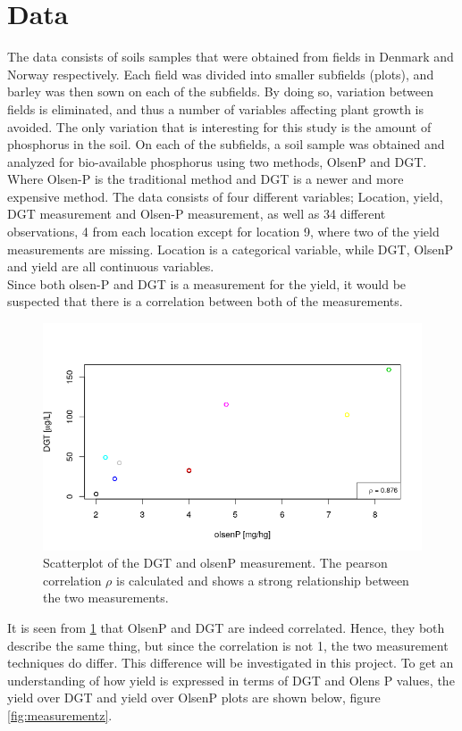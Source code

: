 \documentclass[11pt, fleqn, titlepage]{article}
\begin{document}
\section{Data}
\noindent
The data consists of soils samples that were obtained from fields in Denmark and Norway respectively. Each field was divided into smaller subfields (plots), and barley was then sown on each of the subfields. By doing so, variation between fields is eliminated, and thus a number of variables affecting plant growth is avoided. The only variation that is interesting for this study is the amount of phosphorus in the soil. On each of the subfields, a soil sample was obtained and analyzed for bio-available phosphorus using two methods, OlsenP and DGT. Where Olsen-P is the traditional method and DGT is a newer and more expensive method. The data consists of four different variables; Location, yield, DGT measurement and Olsen-P measurement, as well as 34 different observations, 4 from each location except for location 9, where two of the yield measurements are missing. Location is a categorical variable, while DGT, OlsenP and yield are all continuous variables.
\\ \noindent 
Since both olsen-P and DGT is a measurement for the yield, it would be suspected that there is a correlation between both of the measurements. 
\begin{figure}[H]
	\centering
	\includegraphics[width=0.7\linewidth]{billeder/dgtolsencor.png}
	\caption{Scatterplot of the DGT and olsenP measurement. The pearson correlation $ \rho $ is calculated and shows a strong relationship between the two measurements.}
	\label{fig:dgtolsencor}
\end{figure}
\noindent It is seen from \ref{fig:dgtolsencor} that OlsenP and DGT are indeed correlated. Hence, they both describe the same thing, but since the correlation is not 1, the two measurement techniques do differ. This difference will be investigated in this project. To get an understanding of how yield is expressed in terms of DGT and Olens P values, the yield over DGT and yield over OlsenP plots are shown below, figure \ref{fig:measurementz}. 
\end{document}
